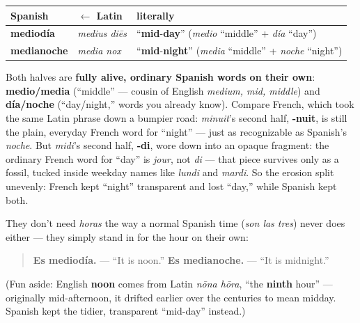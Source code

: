 \begin{cousinweb}
\noindent
\begin{tabularx}{\linewidth}{@{}>{\raggedright\arraybackslash}X>{\raggedright\arraybackslash}X>{\raggedright\arraybackslash}X@{}}
\toprule
\textbf{Spanish} & \textbf{$\leftarrow$ Latin} & \textbf{literally} \\
\midrule
\textbf{mediodía} & \emph{medius diēs} & \textquotedblleft{}\textbf{mid}-\textbf{day}\textquotedblright{} (\emph{medio} \textquotedblleft{}middle\textquotedblright{} + \emph{día} \textquotedblleft{}day\textquotedblright{}) \\
\textbf{medianoche} & \emph{media nox} & \textquotedblleft{}\textbf{mid}-\textbf{night}\textquotedblright{} (\emph{media} \textquotedblleft{}middle\textquotedblright{} + \emph{noche} \textquotedblleft{}night\textquotedblright{}) \\
\bottomrule
\end{tabularx}

Both halves are \textbf{fully alive, ordinary Spanish words on their own}: \textbf{medio/media} (\textquotedblleft{}middle\textquotedblright{} — cousin of English \emph{medium, mid, middle}) and \textbf{día/noche} (\textquotedblleft{}day/night,\textquotedblright{} words you already know). Compare French, which took the same Latin phrase down a bumpier road: \emph{minuit}'s second half, \textbf{-nuit}, is still the plain, everyday French word for \textquotedblleft{}night\textquotedblright{} — just as recognizable as Spanish's \emph{noche}. But \emph{midi}'s second half, \textbf{-di}, wore down into an opaque fragment: the ordinary French word for \textquotedblleft{}day\textquotedblright{} is \emph{jour}, not \emph{di} — that piece survives only as a fossil, tucked inside weekday names like \emph{lundi} and \emph{mardi}. So the erosion split unevenly: French kept \textquotedblleft{}night\textquotedblright{} transparent and lost \textquotedblleft{}day,\textquotedblright{} while Spanish kept both.

They don't need \emph{horas} the way a normal Spanish time (\emph{son las tres}) never does either — they simply stand in for the hour on their own:

\begin{quote}
\textbf{Es mediodía.} — \textquotedblleft{}It is noon.\textquotedblright{} \textbf{Es medianoche.} — \textquotedblleft{}It is midnight.\textquotedblright{}
\end{quote}

(Fun aside: English \textbf{noon} comes from Latin \emph{nōna hōra}, \textquotedblleft{}the \textbf{ninth} hour\textquotedblright{} — originally mid-afternoon, it drifted earlier over the centuries to mean midday. Spanish kept the tidier, transparent \textquotedblleft{}mid-day\textquotedblright{} instead.)
\end{cousinweb}

